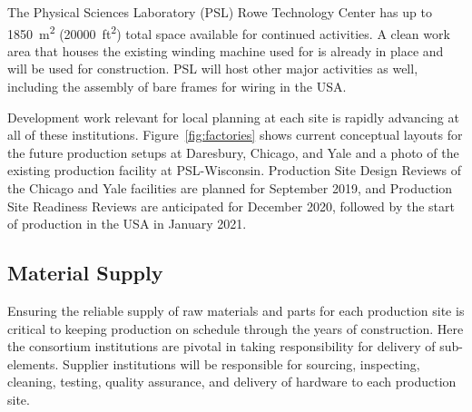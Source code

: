 The Physical Sciences Laboratory (PSL) Rowe Technology Center has up to \SI{1850}{m^2} (\SI{20000}{ft^2}) total space available for continued  activities.  A clean work area that houses the existing winding machine used for  is already in place and will be used for   construction. PSL will host other major activities as well, including the assembly of bare  frames for wiring in the USA.

Development work relevant for local planning at each site is rapidly advancing at all of these institutions.  Figure~\ref{fig:factories} shows current conceptual layouts for the future production setups at Daresbury, Chicago, and Yale and a photo of the existing  production facility at PSL-Wisconsin.  Production Site Design Reviews of the Chicago and Yale facilities are planned for September 2019, and Production Site Readiness Reviews are anticipated for December 2020, followed by the start of  production in the USA in January 2021.  
 

\subsection{Material Supply}  
\label{sec:fdsp-apa-prod-supply}

Ensuring the reliable supply of raw materials and parts for each  production site is critical to keeping  production on schedule through the years of construction. Here the consortium institutions are pivotal in taking responsibility for delivery of  sub-elements. Supplier institutions will be responsible for sourcing, inspecting, cleaning, testing, quality assurance, and delivery of hardware to each production site. 

